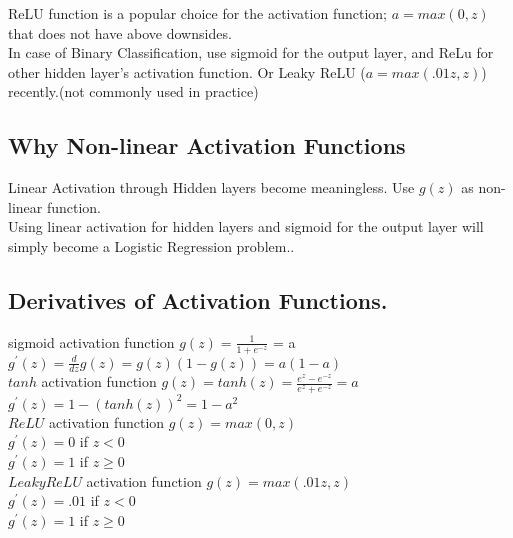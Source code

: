 \documentclass{article}
\begin{document}
ReLU function is a popular choice for the activation function; $a=max(0,z)$ that does not have above downsides.\\

In case of Binary Classification, use sigmoid for the output layer, and ReLu for other hidden layer's activation function. Or Leaky ReLU ($a=max(.01z, z)$) recently.(not commonly used in practice)\\

\newpage
\subsection{Why Non-linear Activation Functions}

Linear Activation through Hidden layers become meaningless.
Use $g(z)$ as non-linear function.\\
Using linear activation for hidden layers and sigmoid for the output layer will simply become a Logistic Regression problem..\\

\newpage
\subsection{Derivatives of Activation Functions.}

sigmoid activation function $g(z)= \frac{1}{1+e^{-z}}$ = a\\

$g^{'}(z)=\frac{d}{dz}g(z) =  g(z)(1-g(z)) = a(1-a)$\\

$tanh$ activation function $g(z)= tanh(z) = \frac{e^z-e^{-z}}{e^z+e^{-z}} = a$\\

$g^{'}(z)=1-(tanh(z))^2 = 1-a^2$\\

$ReLU$ activation function $g(z) = max(0,z)$\\

$g^{'}(z) = 0$ if $z < 0$\\

$g^{'}(z) = 1$ if $z \ge 0$\\

$Leaky ReLU$ activation function $g(z) = max(.01z,z)$\\

$g^{'}(z) = .01$ if $z<0$\\

$g^{'}(z) = 1$ if $z \ge 0$\\
\end{document}
